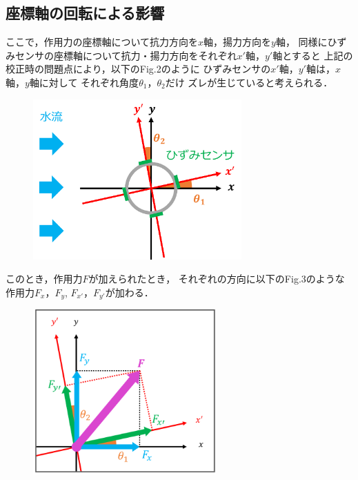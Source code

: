 \documentclass[twocolumn,a4j]{jsarticle}
\begin{document}
\subsection{座標軸の回転による影響}
ここで，作用力の座標軸について抗力方向を$x軸$，揚力方向を$y$軸，
同様にひずみセンサの座標軸について抗力・揚力方向をそれぞれ$x'$軸，$y'$軸とすると
上記の校正時の問題点により，以下のFig.2のように
ひずみセンサの$x'$軸，$y'$軸は，$x$軸，$y$軸に対して
それぞれ角度$\theta_1$，$\theta_2$だけ
ズレが生じていると考えられる．\\

\begin{figure}[htbp]
    \footnotesize
    \begin{center}
        \includegraphics[width=80mm]{../images/image_4.png}
        \caption{}
    \end{center}
\end{figure}

\newpage

このとき，作用力$F$が加えられたとき，
それぞれの方向に以下のFig.3のような作用力$F_x$，$F_y$, $F_{x'}$，$F_{y'}$が加わる．

\begin{figure}[htbp]
    \footnotesize
    \begin{center}
        \includegraphics[width=70mm]{../images/image_2.png}
        \caption{}
    \end{center}
\end{figure}
\end{document}
